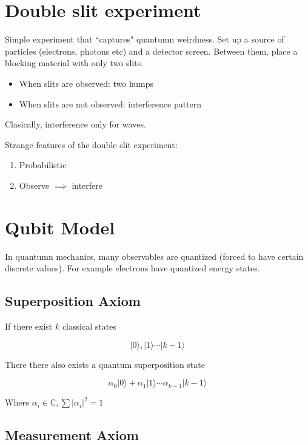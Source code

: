 \documentclass{article}
\title{}
\date{}
\newcommand{\<}{\langle}
\renewcommand{\>}{\rangle}
\newcommand{\q}[1] {|{#1 \rangle}}
\begin{document}
\maketitle


\section{Double slit experiment}

Simple experiment that ``captures" quantumn weirdness. Set up a source of particles (electrons, photons etc) and a detector screen. Between them, place a blocking material with only two slits.

\begin{itemize}
\item When slits are observed: two humps
\item When slits are not observed: interference pattern
\end{itemize}

Clasically, interference only for waves.

Strange features of the double slit experiment:

\begin{enumerate}
\item Probabilistic
\item Observe $\implies$ interfere
\end{enumerate}

\section{Qubit Model}

In quantumn mechanics, many observables are quantized (forced to have certain discrete values). For example electrons have quantized energy states.

\subsection{Superposition Axiom}

If there exist $k$ classical states

$$
\q{0}, \q{1} \cdots \q{k-1}
$$

There there also exists a quantum superposition state

$$
\alpha_0 \q{0} + \alpha_1 \q{1} \cdots \alpha_{k-1} \q{k-1}
$$

Where $\alpha_i \in \mathbb{C}, \sum|\alpha_i|^2 = 1$

\subsection{Measurement Axiom}
\end{document}
